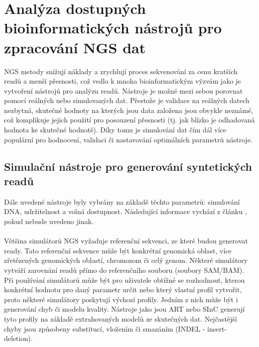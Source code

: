 \documentclass[czech,DP]{thesiskiv}
\numberwithin{equation}{section}
\begin{document}
\chapter{Analýza dostupných bioinformatických nástrojů pro zpracování NGS dat}
NGS metody snižují náklady a zrychlují proces sekvenování za cenu kratších readů a menší přesnosti, což vedlo k mnoha bioinformatickým výzvám jako je vytvoření nástrojů pro analýzu readů. Nástroje je možné mezi sebou porovnat pomocí reálných nebo simulovaných dat. Přestože je validace na reálných datech nezbytná, skutečné hodnoty na kterých jsou data založena jsou obvykle neznámé, což komplikuje jejich použití pro posouzení přesnosti (tj. jak blízko je odhadovaná hodnota ke skutečné hodnotě). Díky tomu je simulování dat čím dál více populární pro hodnocení, validaci či nastavování optimálních parametrů nástroje. \cite{simulation_read}


\section{Simulační nástroje pro generování syntetických readů}
Dále uvedené nástroje byly vybrány na základě těchto parametrů: simulování DNA, udržitelnost a volná dostupnost. Následující informace vychází z článku \cite{simulation_read}, pokud nebude uvedeno jinak.
\\
\\
Většina simulátorů NGS vyžaduje referenční sekvenci, ze které budou generovat ready. Tato referenční sekvence může být konkrétní genomická oblast, více zřetězených genomických oblastí, chromozom či celý genom. Některé simulátory vytváří zarovnání readů přímo do referenčního souboru (soubory SAM/BAM). Při používání simulátorů může být pro uživatele obtížné se rozhodnout, kterou konkrétní hodnotu pro daný parametr určit nebo který vlastní profil vytvořit, proto některé simulátory poskytují výchozí profily. Jedním z nich může být i generování chyb či modelu kvality. Nástroje jako jsou ART nebo SInC generují tyto profily na základě extrahovaných modelů ze skutečných dat. Nejčastější chyby jsou způsobeny substitucí, vložením či smazáním (INDEL - insert-deletion).
\end{document}
